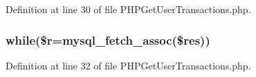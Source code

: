 Definition at line 30 of file P\-H\-P\-Get\-User\-Transactions.\-php.

\hypertarget{_p_h_p_get_user_transactions_8php_a13a796604f93a68cd06c9010c6a6d0e5}{
\subsubsection[{while}]{\setlength{\rightskip}{0pt plus 5cm}while(\$r=mysql\-\_\-fetch\-\_\-assoc(\$res))}}\label{_p_h_p_get_user_transactions_8php_a13a796604f93a68cd06c9010c6a6d0e5}


Definition at line 32 of file P\-H\-P\-Get\-User\-Transactions.\-php.

